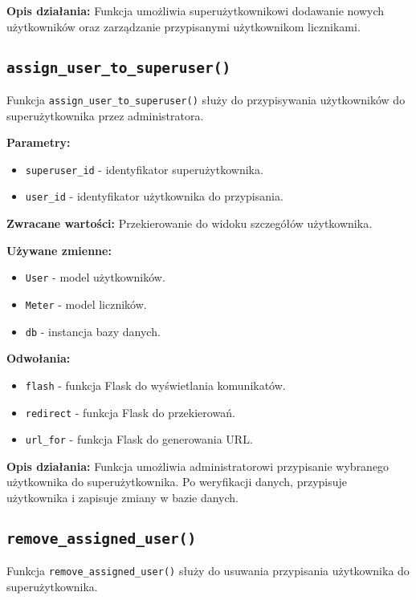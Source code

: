 \documentclass[12pt,a4paper]{report}
\begin{document}
\textbf{Opis działania:}
Funkcja umożliwia superużytkownikowi dodawanie nowych użytkowników oraz zarządzanie przypisanymi użytkownikom licznikami.

\subsection{\texttt{assign\_user\_to\_superuser()}}
\label{sec:assign_user_to_superuser}
Funkcja \texttt{assign\_user\_to\_superuser()} służy do przypisywania użytkowników do superużytkownika przez administratora.

\textbf{Parametry:}
\begin{itemize}
    \item \texttt{superuser\_id} - identyfikator superużytkownika.
    \item \texttt{user\_id} - identyfikator użytkownika do przypisania.
\end{itemize}

\textbf{Zwracane wartości:} Przekierowanie do widoku szczegółów użytkownika.

\textbf{Używane zmienne:}
\begin{itemize}
    \item \texttt{User} - model użytkowników.
    \item \texttt{Meter} - model liczników.
    \item \texttt{db} - instancja bazy danych.
\end{itemize}

\textbf{Odwołania:}
\begin{itemize}
    \item \texttt{flash} - funkcja Flask do wyświetlania komunikatów.
    \item \texttt{redirect} - funkcja Flask do przekierowań.
    \item \texttt{url\_for} - funkcja Flask do generowania URL.
\end{itemize}

\textbf{Opis działania:}
Funkcja umożliwia administratorowi przypisanie wybranego użytkownika do superużytkownika. Po weryfikacji danych, przypisuje użytkownika i zapisuje zmiany w bazie danych.

\subsection{\texttt{remove\_assigned\_user()}}
\label{sec:remove_assigned_user}
Funkcja \texttt{remove\_assigned\_user()} służy do usuwania przypisania użytkownika do superużytkownika.
\end{document}
